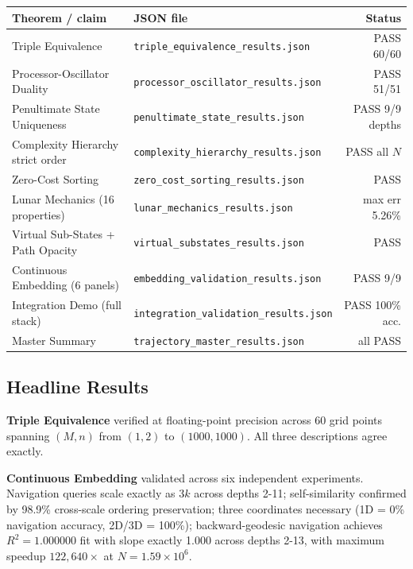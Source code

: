 \documentclass[twocolumn,11pt,a4paper]{article}
\begin{document}
\begin{center}
\begin{tabular}{llr}
\toprule
Theorem / claim & JSON file & Status \\
\midrule
Triple Equivalence                  & \texttt{triple\_equivalence\_results.json}    & PASS 60/60 \\
Processor-Oscillator Duality         & \texttt{processor\_oscillator\_results.json}  & PASS 51/51 \\
Penultimate State Uniqueness         & \texttt{penultimate\_state\_results.json}     & PASS 9/9 depths \\
Complexity Hierarchy strict order    & \texttt{complexity\_hierarchy\_results.json}  & PASS all $N$ \\
Zero-Cost Sorting                    & \texttt{zero\_cost\_sorting\_results.json}    & PASS \\
Lunar Mechanics (16 properties)      & \texttt{lunar\_mechanics\_results.json}       & max err 5.26\% \\
Virtual Sub-States + Path Opacity    & \texttt{virtual\_substates\_results.json}     & PASS \\
Continuous Embedding (6 panels)      & \texttt{embedding\_validation\_results.json}  & PASS 9/9 \\
Integration Demo (full stack)        & \texttt{integration\_validation\_results.json}& PASS 100\% acc. \\
Master Summary                       & \texttt{trajectory\_master\_results.json}     & all PASS \\
\bottomrule
\end{tabular}
\end{center}

\subsection{Headline Results}

\textbf{Triple Equivalence} verified at floating-point precision across 60 grid points spanning $(M, n)$ from $(1, 2)$ to $(1000, 1000)$. All three descriptions agree exactly.

\textbf{Continuous Embedding} validated across six independent experiments. Navigation queries scale exactly as $3k$ across depths 2-11; self-similarity confirmed by 98.9\% cross-scale ordering preservation; three coordinates necessary (1D = 0\% navigation accuracy, 2D/3D = 100\%); backward-geodesic navigation achieves $R^2 = 1.000000$ fit with slope exactly 1.000 across depths 2-13, with maximum speedup $122{,}640\times$ at $N = 1.59 \times 10^6$.
\end{document}
